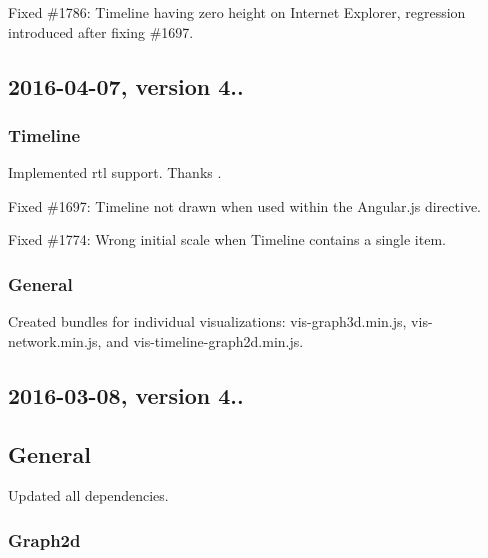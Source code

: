 \begin{DoxyItemize}
\item Fixed \#1786\+: Timeline having zero height on Internet Explorer, regression introduced after fixing \#1697.
\end{DoxyItemize}

\subsection*{2016-\/04-\/07, version 4..}

\subsubsection*{Timeline}


\begin{DoxyItemize}
\item Implemented rtl support. Thanks .
\item Fixed \#1697\+: Timeline not drawn when used within the Angular.\+js directive.
\item Fixed \#1774\+: Wrong initial scale when Timeline contains a single item.
\end{DoxyItemize}

\subsubsection*{General}


\begin{DoxyItemize}
\item Created bundles for individual visualizations\+: {\ttfamily vis-\/graph3d.\+min.\+js}, {\ttfamily vis-\/network.\+min.\+js}, and {\ttfamily vis-\/timeline-\/graph2d.\+min.\+js}.
\end{DoxyItemize}

\subsection*{2016-\/03-\/08, version 4..}

\subsection*{General}


\begin{DoxyItemize}
\item Updated all dependencies.
\end{DoxyItemize}

\subsubsection*{Graph2d}


